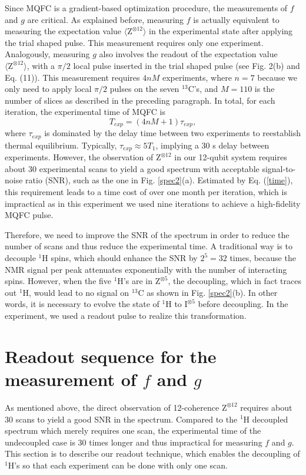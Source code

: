\documentclass[twocolumn,reprint, amsmath,amssymb,showpacs,superscriptaddress]{revtex4-1}
\newcommand{\be}{\begin{equation}}
\newcommand{\ee}{\end{equation}}
\begin{document}
Since MQFC is a gradient-based optimization procedure, the measurements of $f$ and $g$ are critical. As explained before, measuring $f$ is actually equivalent to measuring the expectation value $\langle \text{Z}^{\otimes 12} \rangle$ in the experimental state after applying the trial shaped pulse. This measurement requires only one experiment. Analogously, measuring $g$ also involves the readout of the expectation value $\langle \text{Z}^{\otimes 12} \rangle$, with a $\pi/2$ local pulse inserted in the trial shaped pulse (see Fig. 2(b)  and Eq. (11)). This measurement requires $4nM$ experiments, where $n=7$ because we only need to apply local $\pi/2$ pulses on the seven $^{13}$C's, and $M = 110$ is the number of slices as described in the preceding paragraph. In total, for each iteration, the experimental time of MQFC is
\be
T_{exp}=  (4nM+1)\tau_{exp},
\label{time}
\ee
where $\tau_{exp}$ is dominated by the delay time between two experiments to reestablish thermal equilibrium. Typically, $\tau_{exp} \approx 5T_1$, implying a 30 s delay between experiments. However, the observation of $\text{Z}^{\otimes 12}$ in our 12-qubit system requires about 30 experimental scans to yield a good spectrum with acceptable signal-to-noise ratio (SNR), such as the one in Fig. \ref{spec2}(a). Estimated by Eq. (\ref{time}), this requirement leads to a time cost of over one month per iteration, which is impractical as in this experiment we used nine iterations to achieve a high-fidelity MQFC pulse.

Therefore, we need to improve the SNR of the spectrum in order to reduce the number of scans and thus reduce the experimental time. A traditional way is to decouple $^1$H spins, which should enhance the SNR by $2^5=32$ times, because the NMR signal per peak attenuates exponentially with the number of interacting spins. However, when the five $^1$H's are in $\text{Z}^{\otimes 5}$, the decoupling, which in fact traces out $^1$H, would lead to no signal on $^{13}$C as shown in Fig. \ref{spec2}(b). In other words, it is necessary to evolve the state of $^1$H to $\text{I}^{\otimes 5}$ before decoupling. In the experiment, we used a readout pulse to realize this transformation.

\section{Readout sequence for the measurement of $f$ and $g$ }\label{readout2}

As mentioned above, the direct observation of 12-coherence $\text{Z}^{\otimes 12}$ requires about 30 scans to yield a good SNR in the spectrum. Compared to the $^1$H decoupled spectrum which merely requires one scan, the experimental time of the undecoupled case is 30 times longer and thus impractical for measuring $f$ and $g$. This section is to describe our readout technique, which enables the decoupling of $^1$H's so that each experiment can be done with only one scan.
\end{document}
